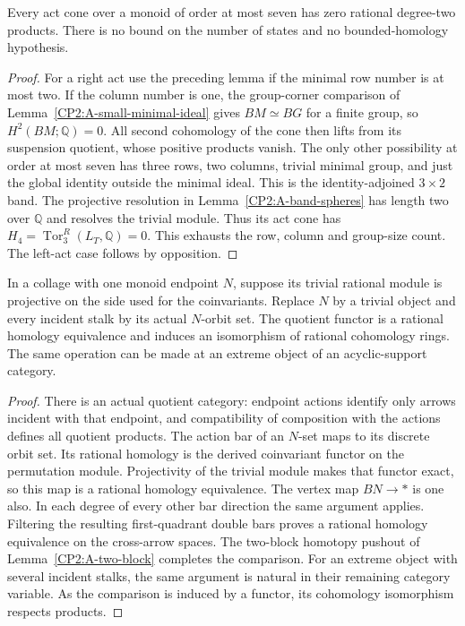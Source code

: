 \begin{corollary}
\label{CP2:A-high-seven-act}
Every act cone over a monoid of order at most seven has zero
rational degree-two products.  There is no bound on the number
of states and no bounded-homology hypothesis.
\end{corollary}
\begin{proof}
For a right act use the preceding lemma if the minimal row
number is at most two.  If the column number is one, the
group-corner comparison of Lemma~\ref{CP2:A-small-minimal-ideal}
gives $BM\simeq BG$ for a finite group, so $H^2(BM;\mathbb Q)=0$.
All second cohomology of the cone then lifts from its suspension
quotient, whose positive products vanish.  The only other
possibility at order at most seven has three rows, two columns,
trivial minimal group, and just the global identity outside the
minimal ideal.  This is the identity-adjoined $3\times2$ band.
The projective resolution in Lemma~\ref{CP2:A-band-spheres}
has length two over $\mathbb Q$ and resolves the trivial module.
Thus its act cone has
$H_4=\operatorname{Tor}_3^R(L_T,\mathbb Q)=0$.
This exhausts the row, column and group-size count.  The left-act
case follows by opposition.
\end{proof}

\begin{lemma}
\label{CP2:A-high-orbits}
In a collage with one monoid endpoint $N$, suppose its trivial
rational module is projective on the side used for the
coinvariants.  Replace $N$ by a trivial object and every
incident stalk by its actual $N$-orbit set.  The quotient functor
is a rational homology equivalence and induces an isomorphism
of rational cohomology rings.  The same operation can be made
at an extreme object of an acyclic-support category.
\end{lemma}
\begin{proof}
There is an actual quotient category: endpoint actions identify
only arrows incident with that endpoint, and compatibility of
composition with the actions defines all quotient products.
The action bar of an $N$-set maps to its discrete orbit set.
Its rational homology is the derived coinvariant functor on
the permutation module.  Projectivity of the trivial module
makes that functor exact, so this map is a rational homology
equivalence.  The vertex map $BN\to *$ is one also.
In each degree of every other bar direction the same argument
applies.  Filtering the resulting first-quadrant double bars
proves a rational homology equivalence on the cross-arrow
spaces.  The two-block homotopy pushout of
Lemma~\ref{CP2:A-two-block} completes the comparison.
For an extreme object with several incident stalks, the same
argument is natural in their remaining category variable.
As the comparison is induced by a functor, its cohomology
isomorphism respects products.
\end{proof}

